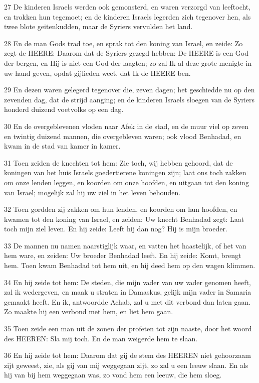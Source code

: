 \par 27 De kinderen Israels werden ook gemonsterd, en waren verzorgd van leeftocht, en trokken hun tegemoet; en de kinderen Israels legerden zich tegenover hen, als twee blote geitenkudden, maar de Syriers vervulden het land.
\par 28 En de man Gods trad toe, en sprak tot den koning van Israel, en zeide: Zo zegt de HEERE: Daarom dat de Syriers gezegd hebben: De HEERE is een God der bergen, en Hij is niet een God der laagten; zo zal Ik al deze grote menigte in uw hand geven, opdat gijlieden weet, dat Ik de HEERE ben.
\par 29 En dezen waren gelegerd tegenover die, zeven dagen; het geschiedde nu op den zevenden dag, dat de strijd aanging; en de kinderen Israels sloegen van de Syriers honderd duizend voetvolks op een dag.
\par 30 En de overgeblevenen vloden naar Afek in de stad, en de muur viel op zeven en twintig duizend mannen, die overgebleven waren; ook vlood Benhadad, en kwam in de stad van kamer in kamer.
\par 31 Toen zeiden de knechten tot hem: Zie toch, wij hebben gehoord, dat de koningen van het huis Israels goedertierene koningen zijn; laat ons toch zakken om onze lenden leggen, en koorden om onze hoofden, en uitgaan tot den koning van Israel; mogelijk zal hij uw ziel in het leven behouden.
\par 32 Toen gordden zij zakken om hun lenden, en koorden om hun hoofden, en kwamen tot den koning van Israel, en zeiden: Uw knecht Benhadad zegt: Laat toch mijn ziel leven. En hij zeide: Leeft hij dan nog? Hij is mijn broeder.
\par 33 De mannen nu namen naarstiglijk waar, en vatten het haastelijk, of het van hem ware, en zeiden: Uw broeder Benhadad leeft. En hij zeide: Komt, brengt hem. Toen kwam Benhadad tot hem uit, en hij deed hem op den wagen klimmen.
\par 34 En hij zeide tot hem: De steden, die mijn vader van uw vader genomen heeft, zal ik wedergeven, en maak u straten in Damaskus, gelijk mijn vader in Samaria gemaakt heeft. En ik, antwoordde Achab, zal u met dit verbond dan laten gaan. Zo maakte hij een verbond met hem, en liet hem gaan.
\par 35 Toen zeide een man uit de zonen der profeten tot zijn naaste, door het woord des HEEREN: Sla mij toch. En de man weigerde hem te slaan.
\par 36 En hij zeide tot hem: Daarom dat gij de stem des HEEREN niet gehoorzaam zijt geweest, zie, als gij van mij weggegaan zijt, zo zal u een leeuw slaan. En als hij van bij hem weggegaan was, zo vond hem een leeuw, die hem sloeg.
